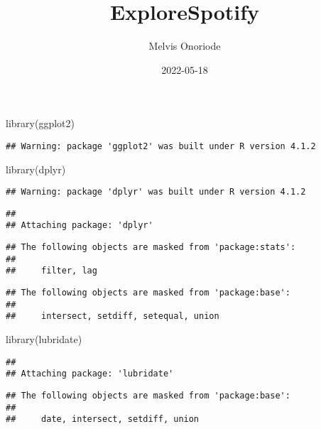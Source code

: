 \documentclass[
]{article}
\title{ExploreSpotify}
\author{Melvis Onoriode}
\date{2022-05-18}
\newenvironment{Shaded}{\begin{snugshade}}{\end{snugshade}}
\newcommand{\FunctionTok}[1]{\textcolor[rgb]{0.00,0.00,0.00}{#1}}
\newcommand{\NormalTok}[1]{#1}
\begin{document}
\maketitle

\begin{Shaded}
\begin{Highlighting}[]
\FunctionTok{library}\NormalTok{(ggplot2)}
\end{Highlighting}
\end{Shaded}

\begin{verbatim}
## Warning: package 'ggplot2' was built under R version 4.1.2
\end{verbatim}

\begin{Shaded}
\begin{Highlighting}[]
\FunctionTok{library}\NormalTok{(dplyr)}
\end{Highlighting}
\end{Shaded}

\begin{verbatim}
## Warning: package 'dplyr' was built under R version 4.1.2
\end{verbatim}

\begin{verbatim}
## 
## Attaching package: 'dplyr'
\end{verbatim}

\begin{verbatim}
## The following objects are masked from 'package:stats':
## 
##     filter, lag
\end{verbatim}

\begin{verbatim}
## The following objects are masked from 'package:base':
## 
##     intersect, setdiff, setequal, union
\end{verbatim}

\begin{Shaded}
\begin{Highlighting}[]
\FunctionTok{library}\NormalTok{(lubridate)}
\end{Highlighting}
\end{Shaded}

\begin{verbatim}
## 
## Attaching package: 'lubridate'
\end{verbatim}

\begin{verbatim}
## The following objects are masked from 'package:base':
## 
##     date, intersect, setdiff, union
\end{verbatim}
\end{document}
